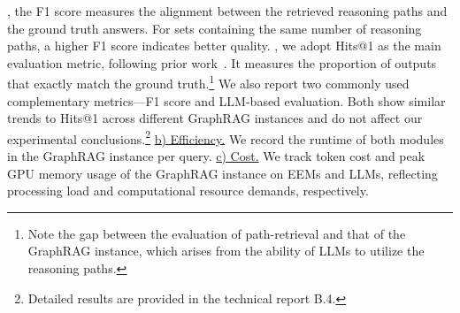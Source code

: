 , the F1 score measures the alignment between the retrieved reasoning paths and the ground truth answers. For sets containing the same number of reasoning paths, a higher F1 score indicates better quality.
, we adopt Hits@1 as the main evaluation metric, following prior work~\cite{knowledgeaugmented, StructGPT, CoK, KB-BINDER, ToG, ToG2.0}. 
It measures the proportion of outputs that exactly match the ground truth.\footnote{Note the gap between the evaluation of path-retrieval and that of the GraphRAG instance, which arises from the ability of LLMs to  utilize the reasoning paths.} We also report two commonly used complementary metrics—F1 score and LLM-based evaluation. Both show similar trends to Hits@1 across different GraphRAG instances and do not affect our experimental conclusions.\footnote{Detailed results are provided in the technical report B.4.}
\underline{b) Efficiency.} We record the runtime of both modules in the GraphRAG instance per query. %
\underline{c) Cost.} We track token cost and peak GPU memory usage of the GraphRAG instance on EEMs and LLMs, reflecting processing load and computational resource demands, respectively.

